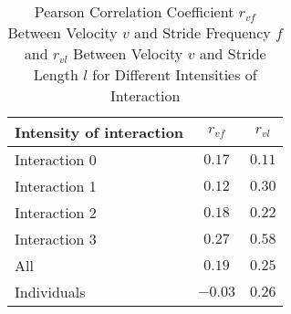 \begin{table}[!t]
\caption{Pearson Correlation Coefficient $r_{vf}$ Between Velocity $v$ and Stride Frequency $f$ and $r_{vl}$ Between Velocity $v$ and Stride Length $l$ for Different Intensities of Interaction\label{tab:pearson_correlation}}
\centering
\begin{tabular}{lcc}
\toprule
Intensity of interaction & $r_{vf}$ & $r_{vl}$ \\
\midrule
Interaction 0 & $0.17$ & $0.11$ \\
Interaction 1 & $0.12$ & $0.30$ \\
Interaction 2 & $0.18$ & $0.22$ \\
Interaction 3 & $0.27$ & $0.58$ \\
\midrule
All & $0.19$ & $0.25$ \\
Individuals & $-0.03$ & $0.26$ \\
\bottomrule
\end{tabular}
\end{table}

